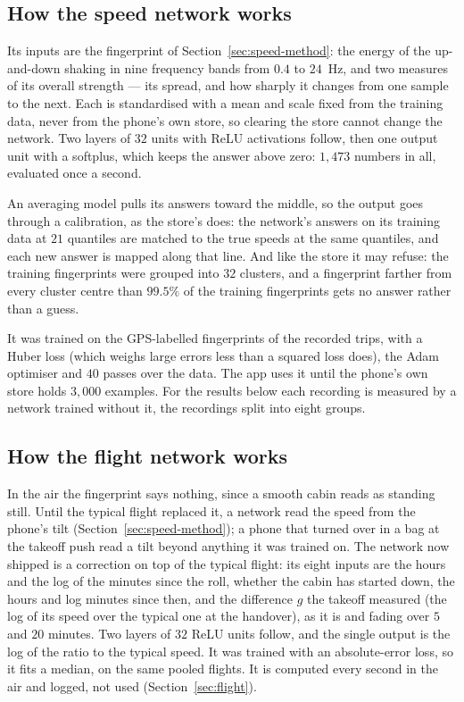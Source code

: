 \documentclass[11pt]{article}
\begin{document}
\subsection{How the speed network works}

Its inputs are the fingerprint of Section~\ref{sec:speed-method}: the energy of the up-and-down shaking in
nine frequency bands from $0.4$ to $24$~Hz, and two measures of its overall strength --- its spread, and how
sharply it changes from one sample to the next. Each is standardised with a mean and scale fixed from the
training data, never from the phone's own store, so clearing the store cannot change the network. Two
layers of $32$ units with ReLU activations follow, then one output unit with a softplus, which keeps the
answer above zero: $1{,}473$ numbers in all, evaluated once a second.

An averaging model pulls its answers toward the middle, so the output goes through a calibration, as the
store's does: the network's answers on its training data at $21$ quantiles are matched to the true speeds
at the same quantiles, and each new answer is mapped along that line. And like the store it may refuse:
the training fingerprints were grouped into $32$ clusters, and a fingerprint farther from every cluster
centre than $99.5\%$ of the training fingerprints gets no answer rather than a guess.

It was trained on the GPS-labelled fingerprints of the recorded trips, with a Huber loss (which weighs large
errors less than a squared loss does), the Adam optimiser and $40$ passes over the data. The app uses it until
the phone's own store holds $3{,}000$ examples. For the results below each recording is measured by a
network trained without it, the recordings split into eight groups.

\subsection{How the flight network works}

In the air the fingerprint says nothing, since a smooth cabin reads as standing still. Until the typical
flight replaced it, a network read the speed from the phone's tilt (Section~\ref{sec:speed-method}); a phone
that turned over in a bag at the takeoff push read a tilt beyond anything it was trained on. The network
now shipped is a correction on top of the typical flight: its eight inputs are the hours and the log of the
minutes since the roll, whether the cabin has started down, the hours and log minutes since then, and the
difference $g$ the takeoff measured (the log of its speed over the typical one at the handover), as it is
and fading over $5$ and $20$ minutes. Two layers of $32$ ReLU units follow, and the single output is the log
of the ratio to the typical speed. It was trained with an absolute-error loss, so it fits a median, on the
same pooled flights. It is computed every second in the air and logged, not used (Section~\ref{sec:flight}).
\end{document}
